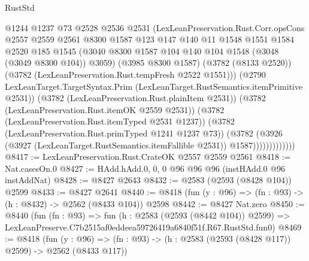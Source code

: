 \begin{lexlean}{RustStd}
\begin{coremodule}
                          @1244
                          @1237
                          @73
                          @2528
                          @2536
                          @2531
                          (LexLeanPreservation.Rust.Corr.opsCons
                            @2557
                            @2559
                            @2561
                            @8300
                            @1587
                            @123
                            @147
                            @140
                            @11
                            @1548
                            @1551
                            @1584
                            @2520
                            @185
                            @1545
                            (@3040
                              @8300
                              @1587
                              @104
                              @140
                              @104
                              @1548
                              (@3048 (@3049 @8300 @104))
                              @3059)
                            (@3985 @8300 @1587)
                            (@3782 (@8133 @2520))
                            (@3782 (LexLeanPreservation.Rust.tempFresh @2522 @1551)))
                          (@2790
                            LexLeanTarget.TargetSyntax.Prim
                            (LexLeanTarget.RustSemantics.itemPrimitive @2531))
                          (@3782 (LexLeanPreservation.Rust.plainItem @2531))
                          (@3782 (LexLeanPreservation.Rust.itemOK @2559 @2531))
                          (@3782 (LexLeanPreservation.Rust.itemTyped @2531 @1237))
                          (@3782 (LexLeanPreservation.Rust.primTyped @1241 @1237 @73))
                          (@3782
                            (@3926
                              (@3927 (LexLeanTarget.RustSemantics.itemFallible @2531))
                              @1587)))))))))))))
@8417 := LexLeanPreservation.Rust.CrateOK @2557 @2559 @2561
@8418 := Nat.casesOn.{0}
@8427 := HAdd.hAdd.{0, 0, 0} @96 @96 @96 (instHAdd.{0} @96 instAddNat)
@8428 := @8427 @2643
@8432 := @2583 (@2593 (@8428 @104)) @2599
@8433 := @8427 @2641
@8440 := @8418 (fun (y : @96) => (fn : @93) -> (h : @8432) -> @2562 (@8433 @104)) @2598
@8442 := @8427 Nat.zero
@8450 := @8440
    (fun (fn : @93) =>
    fun (h : @2583 (@2593 (@8442 @104)) @2599) =>
    LexLeanPreserve.C7b2515af0eddeea59726419a6840f51f.R67.RustStd.fun0)
@8469 := @8418
    (fun (y : @96) => (fn : @93) -> (h : @2583 (@2593 (@8428 @117)) @2599) -> @2562 (@8433 @117))

\end{coremodule}
\end{lexlean}
